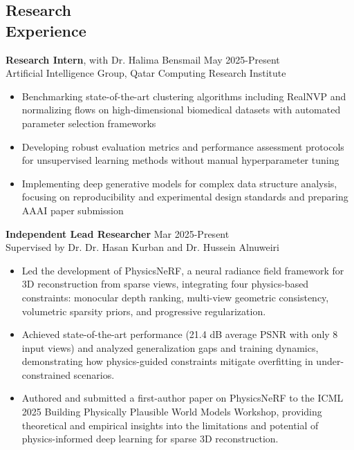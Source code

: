 \documentclass[resmargin, 10pt]{res} %
\begin{document}
\begin{resume}
\section{Research \\ Experience}

{\bf Research Intern}, with Dr. Halima Bensmail \hfill May 2025-Present \\
Artificial Intelligence Group, Qatar Computing Research Institute 
\begin{itemize}[itemsep=0em]
\item Benchmarking state-of-the-art clustering algorithms including RealNVP and normalizing flows on high-dimensional biomedical datasets with automated parameter selection frameworks
\item Developing robust evaluation metrics and performance assessment protocols for unsupervised learning methods without manual hyperparameter tuning
\item Implementing deep generative models for complex data structure analysis, focusing on reproducibility and experimental design standards and preparing AAAI paper submission
\end{itemize} 
\vspace{-3pt}

{\bf Independent Lead Researcher} \hfill Mar 2025-Present \\
Supervised by Dr. Dr. Hasan Kurban and Dr. Hussein Alnuweiri
\begin{itemize}[itemsep=0em]
\item Led the development of PhysicsNeRF, a neural radiance field framework for 3D reconstruction from sparse views, integrating four physics-based constraints: monocular depth ranking, multi-view geometric consistency, volumetric sparsity priors, and progressive regularization.
\item Achieved state-of-the-art performance (21.4 dB average PSNR with only 8 input views) and analyzed generalization gaps and training dynamics, demonstrating how physics-guided constraints mitigate overfitting in under-constrained scenarios.
\item Authored and submitted a first-author paper on PhysicsNeRF to the ICML 2025 Building Physically Plausible World Models Workshop, providing theoretical and empirical insights into the limitations and potential of physics-informed deep learning for sparse 3D reconstruction.
\end{itemize}



\end{resume}
\end{document}
